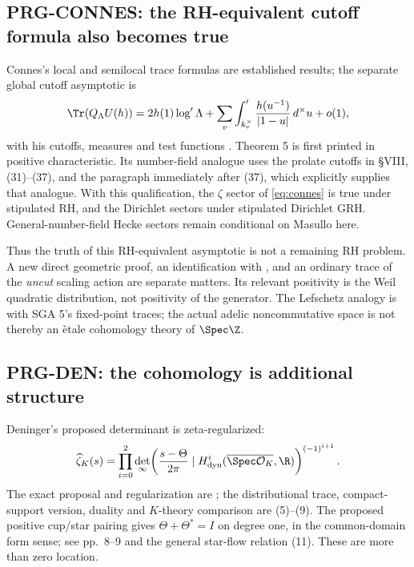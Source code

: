 \subsection{PRG-CONNES: the RH-equivalent cutoff formula also becomes true}
Connes's local and semilocal trace formulas are established results; the separate global cutoff asymptotic is
\begin{equation}\label{eq:connes}
 \Tr(Q_\Lambda U(h))=2h(1)\log'\Lambda+
 \sum_v\int_{k_v^\times}'\frac{h(u^{-1})}{|1-u|}\,d^\times u+o(1),
\end{equation}
with his cutoffs, measures and test functions \cite[\S VIII, (16), Theorem 5]{connes}. Theorem 5 is first printed in positive characteristic. Its number-field analogue uses the prolate cutoffs in \S VIII, (31)--(37), and the paragraph immediately after (37), which explicitly supplies that analogue. With this qualification, the $\zeta$ sector of \eqref{eq:connes} is true under stipulated RH, and the Dirichlet sectors under stipulated Dirichlet GRH. General-number-field Hecke sectors remain conditional on Masullo here.

Thus the truth of this RH-equivalent asymptotic is not a remaining RH problem. A new direct geometric proof, an identification with , and an ordinary trace of the \emph{uncut} scaling action are separate matters. Its relevant positivity is the Weil quadratic distribution, not positivity of the generator. The Lefschetz analogy is with SGA 5's fixed-point traces; the actual adelic noncommutative space is not thereby an \`etale cohomology theory of $\Spec\Z$.

\subsection{PRG-DEN: the cohomology is additional structure}
Deninger's proposed determinant is zeta-regularized:
\[
 \widehat\zeta_K(s)=\prod_{i=0}^2
 \det_\infty\!\left(\frac{s-\Theta}{2\pi}\mid
 H^i_{\mathrm{dyn}}(\overline{\Spec\mathcal O_K},\R)\right)^{(-1)^{i+1}}.
\]
The exact proposal and regularization are \cite[\S3, (2)--(3)]{deninger}; the distributional trace, compact-support version, duality and $K$-theory comparison are (5)--(9). The proposed positive cup/star pairing gives $\Theta+\Theta^*=I$ on degree one, in the common-domain form sense; see pp.~8--9 and the general star-flow relation (11). These are more than zero location.

